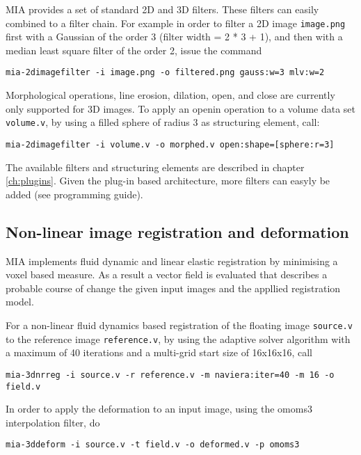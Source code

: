 MIA provides a set of standard 2D and 3D filters. 
These filters can easily combined  to a filter chain. 
For example in order to filter a 2D image \texttt{image.png} first with a Gaussian of the order 3 (filter width = 2 * 3 + 1), and then with a 
  median least square filter of the order 2, issue the command 
\begin{lstlisting}
mia-2dimagefilter -i image.png -o filtered.png gauss:w=3 mlv:w=2
\end{lstlisting}

Morphological operations, line erosion, dilation, open, and close are currently only supported for 3D images. 
To apply an openin operation to a volume data set \texttt{volume.v}, by using a filled sphere of radius 3 as structuring element, 
  call: 
\begin{lstlisting}
mia-2dimagefilter -i volume.v -o morphed.v open:shape=[sphere:r=3]
\end{lstlisting}

The available filters and structuring elements are described in chapter \ref{ch:plugins}. 
Given the plug-in based architecture, more filters can easyly be added (see programming guide).

\subsection{Non-linear image registration and deformation}

MIA implements fluid dynamic and linear elastic registration by minimising a voxel based measure. 
As a result a vector field is evaluated that describes a probable course of change the given input images and the appllied registration model. 

For a non-linear fluid dynamics based registration of the floating image \texttt{source.v} to the reference image \texttt{reference.v}, by using the 
 adaptive solver algorithm \cite{wollny02comput} with a maximum of 40 iterations and a multi-grid start size of 16x16x16, call 

\begin{lstlisting}
mia-3dnrreg -i source.v -r reference.v -m naviera:iter=40 -m 16 -o field.v 
\end{lstlisting}

\noindent 
In order to apply the deformation to an input image, using the omoms3 interpolation filter, do 
\begin{lstlisting}
mia-3ddeform -i source.v -t field.v -o deformed.v -p omoms3
\end{lstlisting}





